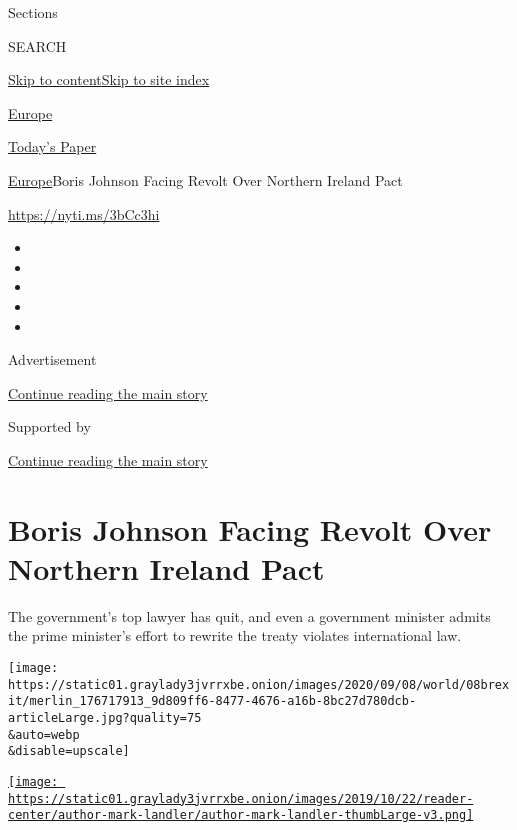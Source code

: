 Sections

SEARCH

\protect\hyperlink{site-content}{Skip to
content}\protect\hyperlink{site-index}{Skip to site index}

\href{https://www.nytimes3xbfgragh.onion/section/world/europe}{Europe}

\href{https://myaccount.nytimes3xbfgragh.onion/auth/login?response_type=cookie\&client_id=vi}{}

\href{https://www.nytimes3xbfgragh.onion/section/todayspaper}{Today's
Paper}

\href{/section/world/europe}{Europe}\textbar{}Boris Johnson Facing
Revolt Over Northern Ireland Pact

\url{https://nyti.ms/3bCc3hi}

\begin{itemize}
\item
\item
\item
\item
\item
\end{itemize}

Advertisement

\protect\hyperlink{after-top}{Continue reading the main story}

Supported by

\protect\hyperlink{after-sponsor}{Continue reading the main story}

\hypertarget{boris-johnson-facing-revolt-over-northern-ireland-pact}{%
\section{Boris Johnson Facing Revolt Over Northern Ireland
Pact}\label{boris-johnson-facing-revolt-over-northern-ireland-pact}}

The government's top lawyer has quit, and even a government minister
admits the prime minister's effort to rewrite the treaty violates
international law.

\texttt{[image: https://static01.graylady3jvrrxbe.onion/images/2020/09/08/world/08brexit/merlin\_176717913\_9d809ff6-8477-4676-a16b-8bc27d780dcb-articleLarge.jpg?quality=75\\\&auto=webp\\\&disable=upscale]}

\href{https://www.nytimes3xbfgragh.onion/by/mark-landler}{\texttt{[image: https://static01.graylady3jvrrxbe.onion/images/2019/10/22/reader-center/author-mark-landler/author-mark-landler-thumbLarge-v3.png]}}

